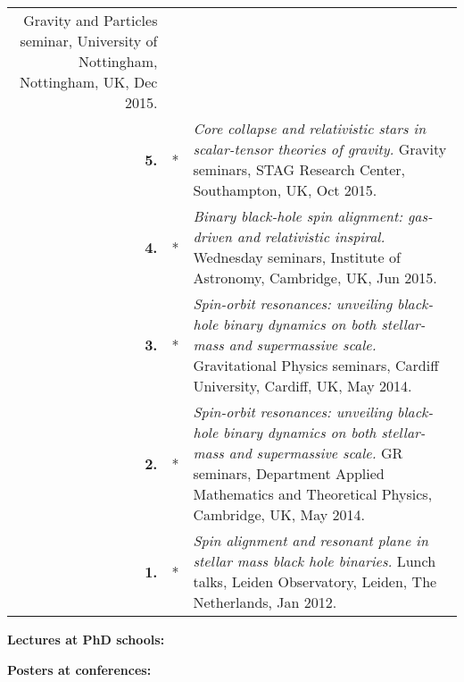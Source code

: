 {\begin{longtable}{rp{0.3cm}p{15.8cm}}
\newline{}
Gravity and Particles seminar, University of Nottingham, Nottingham, UK, Dec 2015.
\vspace{0.05cm}\\
%
\textbf{5.} & * & \textit{Core collapse and relativistic stars in scalar-tensor theories of gravity.}
\newline{}
Gravity seminars, STAG Research Center, Southampton, UK, Oct 2015.
\vspace{0.05cm}\\
%
\textbf{4.} & * & \textit{Binary black-hole spin alignment: gas-driven and relativistic inspiral.}
\newline{}
Wednesday seminars, Institute of Astronomy, Cambridge, UK, Jun 2015.
\vspace{0.05cm}\\
%
\textbf{3.} & * & \textit{Spin-orbit resonances: unveiling black-hole binary dynamics on both stellar-mass and supermassive scale.}
\newline{}
Gravitational Physics seminars, Cardiff University, Cardiff, UK, May 2014.
\vspace{0.05cm}\\
%
\textbf{2.} & * & \textit{Spin-orbit resonances: unveiling black-hole binary dynamics on both stellar-mass and supermassive scale.}
\newline{}
GR seminars, Department Applied Mathematics and Theoretical Physics, Cambridge, UK,  May 2014.
\vspace{0.05cm}\\
%
\textbf{1.} & * & \textit{Spin alignment and resonant plane in stellar mass black hole binaries.}
\newline{}
Lunch talks, Leiden Observatory, Leiden, The Netherlands, Jan 2012.
\vspace{0.05cm}\\
%
\end{longtable} }
\textcolor{color1}{\textbf{Lectures at PhD schools:}}
\vspace{-0.5cm}

\textcolor{color1}{\textbf{Posters at conferences:}}
\vspace{-0.5cm}

